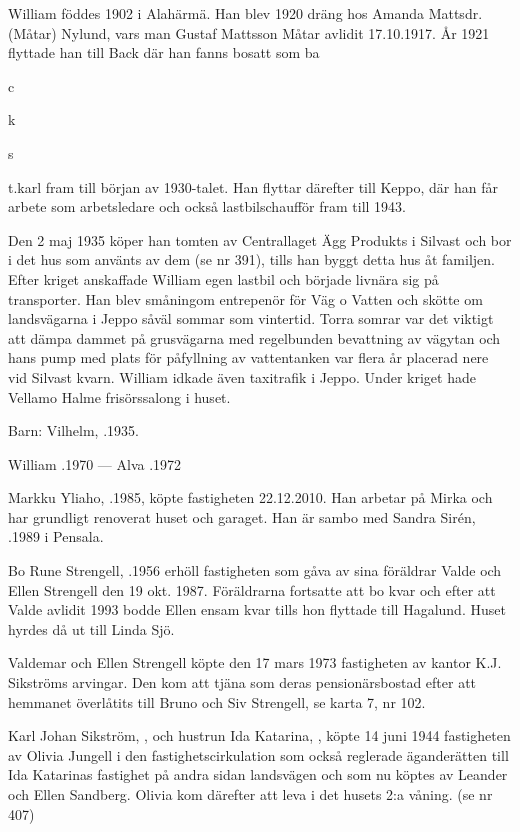 William föddes 1902 i Alahärmä. Han blev 1920 dräng hos Amanda Mattsdr.(Måtar) Nylund, vars man Gustaf Mattsson Måtar avlidit 17.10.1917. År 1921 flyttade han till Back där han fanns bosatt som ba{c{k{s{t{}.karl fram till början av 1930-talet. Han flyttar därefter till Keppo, där han får arbete som arbetsledare och också lastbilschaufför fram till 1943.

Den 2 maj 1935 köper han tomten av Centrallaget Ägg Produkts i Silvast och bor i det hus som använts av dem (se nr 391), tills han byggt detta hus åt familjen. Efter kriget anskaffade William egen lastbil och började livnära sig på transporter. Han blev småningom entrepenör för Väg o Vatten och skötte om landsvägarna i Jeppo såväl sommar som vintertid. Torra somrar var det viktigt att dämpa dammet på grusvägarna med regelbunden bevattning av vägytan och hans pump med plats för påfyllning av vattentanken var flera år placerad nere vid Silvast kvarn. William idkade även taxitrafik i Jeppo. Under kriget hade Vellamo Halme frisörssalong i huset.

Barn:  Vilhelm, .1935.

William .1970  ---  Alva .1972






Markku Yliaho, .1985, köpte fastigheten 22.12.2010. Han arbetar på Mirka och har grundligt renoverat huset och garaget. Han är sambo med Sandra Sirén, .1989 i Pensala.


Bo Rune Strengell, .1956 erhöll fastigheten som gåva av sina föräldrar Valde och Ellen Strengell den 19 okt. 1987. Föräldrarna fortsatte att bo kvar och efter att Valde avlidit 1993 bodde Ellen ensam kvar tills hon flyttade till Hagalund. Huset hyrdes då ut till Linda Sjö.


Valdemar och Ellen Strengell köpte den 17 mars 1973 fastigheten av kantor K.J. Sikströms arvingar. Den kom att tjäna som deras pensionärsbostad efter att hemmanet överlåtits till Bruno och Siv Strengell, se karta 7, nr 102.


Karl Johan Sikström, , och hustrun Ida Katarina, , köpte 14 juni 1944 fastigheten av Olivia Jungell i den fastighetscirkulation som också reglerade äganderätten till Ida Katarinas fastighet på andra sidan landsvägen och som nu köptes av Leander och Ellen Sandberg. Olivia kom därefter att leva i det husets 2:a våning. (se nr 407)

}}}}
